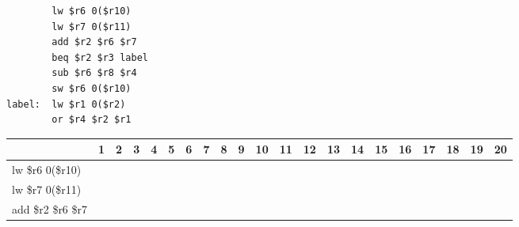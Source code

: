 \documentclass[a4paper,10pt]{article}
\begin{document}
\begin{enumerate}
{        \begin{verbatim}
        lw $r6 0($r10)
        lw $r7 0($r11)
        add $r2 $r6 $r7
        beq $r2 $r3 label
        sub $r6 $r8 $r4
        sw $r6 0($r10)
label: 	lw $r1 0($r2)
        or $r4 $r2 $r1
        \end{verbatim}
        
        \begin{table}[!hbpt]
            \begin{tabular}{|l|c|c|c|c|c|c|c|c|c|c|c|c|c|c|c|c|c|l|l|l|}
            \hline
                                 & \multicolumn{1}{l|}{1} & \multicolumn{1}{l|}{2} & \multicolumn{1}{l|}{3} & \multicolumn{1}{l|}{4} & \multicolumn{1}{l|}{5} & \multicolumn{1}{l|}{6} & \multicolumn{1}{l|}{7} & \multicolumn{1}{l|}{8} & \multicolumn{1}{l|}{9} & \multicolumn{1}{l|}{10} & \multicolumn{1}{l|}{11} & \multicolumn{1}{l|}{12} & \multicolumn{1}{l|}{13} & \multicolumn{1}{l|}{14} & \multicolumn{1}{l|}{15} & \multicolumn{1}{l|}{16} & \multicolumn{1}{l|}{17} & 18 & 19 & 20 \\ \hline
            lw \$r6 0(\$r10)       &                        &                        &                        &                        &                        &                        &                        &                        &                        &                         &                         &                         &                         &                         &                         &                         &                         &    &    &    \\ \hline
            lw \$r7 0(\$r11)       &                        &                        &                        &                        &                        &                        &                        &                        &                        &                         &                         &                         &                         &                         &                         &                         &                         &    &    &    \\ \hline
            add \$r2 \$r6 \$r7     &                        &                        &                        &                        &                        &                        &                        &                        &                        &                         &                         &                         &                         &                         &                         &                         &                         &    &    &    \\ \hline

\end{tabular}
\end{table}}
\end{enumerate}
\end{document}
